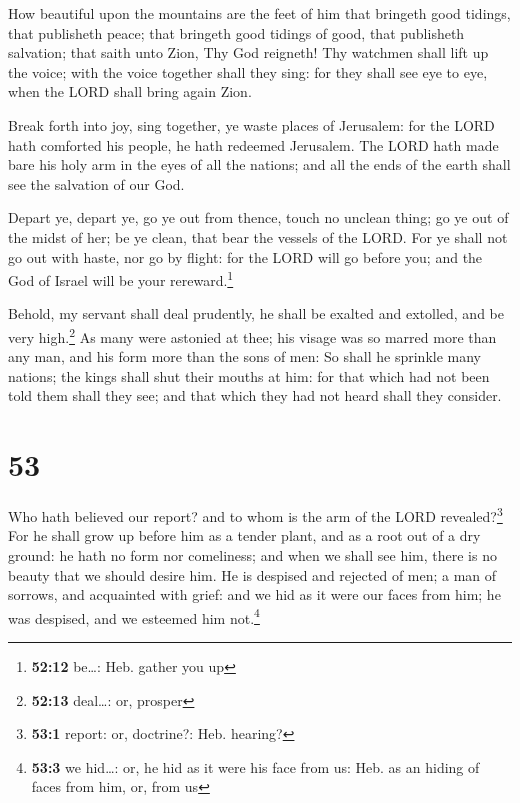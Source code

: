  How beautiful upon the mountains are the feet of him that
bringeth good tidings, that publisheth peace; that bringeth good tidings
of good, that publisheth salvation; that saith unto Zion, Thy God
reigneth!  Thy watchmen shall lift up the voice; with the
voice together shall they sing: for they shall see eye to eye, when the
LORD shall bring again Zion.

 Break forth into joy, sing together, ye waste places of
Jerusalem: for the LORD hath comforted his people, he hath redeemed
Jerusalem.  The LORD hath made bare his holy arm in the
eyes of all the nations; and all the ends of the earth shall see the
salvation of our God.

 Depart ye, depart ye, go ye out from thence, touch no
unclean thing; go ye out of the midst of her; be ye clean, that bear the
vessels of the LORD.  For ye shall not go out with haste,
nor go by flight: for the LORD will go before you; and the God of Israel
will be your rereward.\footnote{\textbf{52:12} be\ldots: Heb. gather you
  up}

 Behold, my servant shall deal prudently, he shall be
exalted and extolled, and be very high.\footnote{\textbf{52:13}
  deal\ldots: or, prosper}  As many were astonied at
thee; his visage was so marred more than any man, and his form more than
the sons of men:  So shall he sprinkle many nations; the
kings shall shut their mouths at him: for that which had not been told
them shall they see; and that which they had not heard shall they
consider.

\hypertarget{section-52}{%
\section{53}\label{section-52}}

 Who hath believed our report? and to whom is the arm of
the LORD revealed?\footnote{\textbf{53:1} report: or, doctrine?: Heb.
  hearing?}  For he shall grow up before him as a tender
plant, and as a root out of a dry ground: he hath no form nor
comeliness; and when we shall see him, there is no beauty that we should
desire him.  He is despised and rejected of men; a man of
sorrows, and acquainted with grief: and we hid as it were our faces from
him; he was despised, and we esteemed him not.\footnote{\textbf{53:3} we
  hid\ldots: or, he hid as it were his face from us: Heb. as an hiding
  of faces from him, or, from us}

